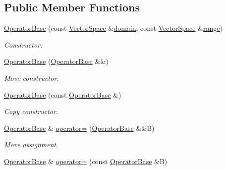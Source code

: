 \subsection*{\-Public \-Member \-Functions}
\begin{DoxyCompactItemize}
\item 
\hyperlink{classSpacy_1_1OperatorBase_a0e61c53f3dc6088609701c022410841c}{\-Operator\-Base} (const \hyperlink{classSpacy_1_1VectorSpace}{\-Vector\-Space} \&\hyperlink{classSpacy_1_1OperatorBase_a2588f9b3e0188820c4c494e63293dc6f}{domain}, const \hyperlink{classSpacy_1_1VectorSpace}{\-Vector\-Space} \&\hyperlink{classSpacy_1_1OperatorBase_ab19d3b7a6f290b1079248f1e567e53d6}{range})
\begin{DoxyCompactList}\small\item\em \-Constructor. \end{DoxyCompactList}\item 
\hypertarget{classSpacy_1_1OperatorBase_aa7888aebbdc5383ad987d600fcff5078}{\hyperlink{classSpacy_1_1OperatorBase_aa7888aebbdc5383ad987d600fcff5078}{\-Operator\-Base} (\hyperlink{classSpacy_1_1OperatorBase}{\-Operator\-Base} \&\&)}\label{classSpacy_1_1OperatorBase_aa7888aebbdc5383ad987d600fcff5078}

\begin{DoxyCompactList}\small\item\em \-Move constructor. \end{DoxyCompactList}\item 
\hypertarget{classSpacy_1_1OperatorBase_ac738e1d3e255f6168a767d30c7eabe8a}{\hyperlink{classSpacy_1_1OperatorBase_ac738e1d3e255f6168a767d30c7eabe8a}{\-Operator\-Base} (const \hyperlink{classSpacy_1_1OperatorBase}{\-Operator\-Base} \&)}\label{classSpacy_1_1OperatorBase_ac738e1d3e255f6168a767d30c7eabe8a}

\begin{DoxyCompactList}\small\item\em \-Copy constructor. \end{DoxyCompactList}\item 
\hypertarget{classSpacy_1_1OperatorBase_a561bedbbf760230dbf18c9f9aa72a4bf}{\hyperlink{classSpacy_1_1OperatorBase}{\-Operator\-Base} \& \hyperlink{classSpacy_1_1OperatorBase_a561bedbbf760230dbf18c9f9aa72a4bf}{operator=} (\hyperlink{classSpacy_1_1OperatorBase}{\-Operator\-Base} \&\&\-B)}\label{classSpacy_1_1OperatorBase_a561bedbbf760230dbf18c9f9aa72a4bf}

\begin{DoxyCompactList}\small\item\em \-Move assignment. \end{DoxyCompactList}\item 
\hypertarget{classSpacy_1_1OperatorBase_a531b5871783e43a5a65eb4da5802dea9}{\hyperlink{classSpacy_1_1OperatorBase}{\-Operator\-Base} \& \hyperlink{classSpacy_1_1OperatorBase_a531b5871783e43a5a65eb4da5802dea9}{operator=} (const \hyperlink{classSpacy_1_1OperatorBase}{\-Operator\-Base} \&\-B)}\label{classSpacy_1_1OperatorBase_a531b5871783e43a5a65eb4da5802dea9}


\end{DoxyCompactItemize}

